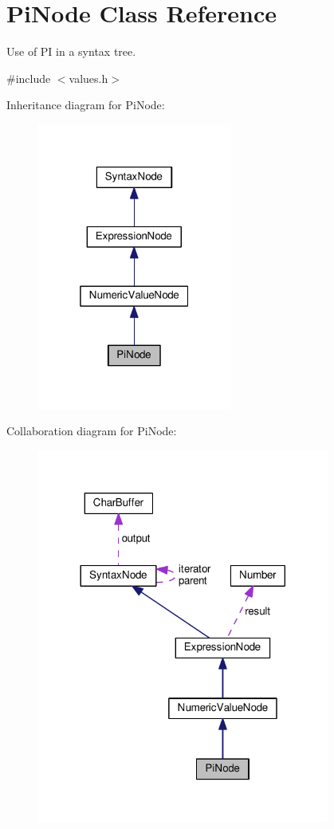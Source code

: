 \hypertarget{classPiNode}{}\section{Pi\+Node Class Reference}
\label{classPiNode}


Use of PI in a syntax tree.  




{\ttfamily \#include $<$values.\+h$>$}



Inheritance diagram for Pi\+Node\+:\nopagebreak
\begin{figure}[H]
\begin{center}
\leavevmode
\includegraphics[width=181pt]{classPiNode__inherit__graph}
\end{center}
\end{figure}


Collaboration diagram for Pi\+Node\+:\nopagebreak
\begin{figure}[H]
\begin{center}
\leavevmode
\includegraphics[width=272pt]{classPiNode__coll__graph}
\end{center}
\end{figure}
